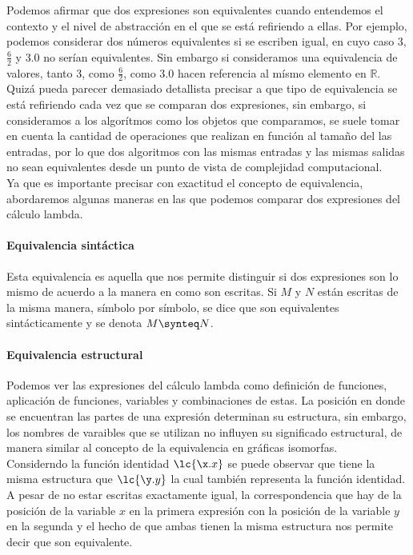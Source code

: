 Podemos afirmar que dos expresiones son equivalentes cuando entendemos el
contexto y el nivel de abstracción en el que se está refiriendo a ellas. Por
ejemplo, podemos considerar dos números equivalentes si se escriben igual, en
cuyo caso \(3\),  \(\frac{6}{2}\) y \(3.0\) no serían equivalentes. Sin embargo si consideramos
una equivalencia de valores, tanto \(3\), como \(\frac{6}{2}\), como \(3.0\) hacen referencia al mísmo
elemento en \(\mathbb{R}\). Quizá pueda parecer demasiado detallista precisar a
que tipo de equivalencia se está refiriendo cada vez que se comparan dos
expresiones, sin embargo, si consideramos a los algorítmos como los objetos que
comparamos, se suele tomar en cuenta la cantidad de operaciones que
realizan en función al tamaño del las entradas, por lo que dos algoritmos con
las mismas entradas y las mismas salidas no sean equivalentes desde un punto de
vista de complejidad computacional.\\

Ya que es importante precisar con exactitud el concepto de equivalencia,
abordaremos algunas maneras en las que podemos comparar dos expresiones del
cálculo lambda.

\paragraph{Equivalencia sintáctica}

Esta equivalencia es aquella que nos permite distinguir si dos expresiones son
lo mismo de acuerdo a la manera en como son escritas. Si \(M\) y \(N\) están
escritas de la misma manera, símbolo por símbolo, se dice que son equivalentes
sintácticamente y se denota \(M \synteq N\).\\

\paragraph{Equivalencia estructural}

Podemos ver las expresiones del cálculo lambda como definición de funciones,
aplicación de funciones, variables y combinaciones de estas. La posición en
donde se encuentran las partes de una expresión determinan su estructura, sin
embargo, los nombres de varaibles que se utilizan no influyen su significado
estructural, de manera similar al concepto de la equivalencia en gráficas
isomorfas.\\

Considerndo la función identidad \(\lc{\x.x}\) se puede observar que tiene la
misma estructura que \(\lc{\y.y}\) la cual también representa la función
identidad. A pesar de no estar escritas exactamente igual, la correspondencia
que hay de la posición de la variable \(x\) en la primera expresión con la
posición de la variable \(y\) en la segunda y el hecho de que ambas tienen la
misma estructura nos permite decir que son equivalente.\\

